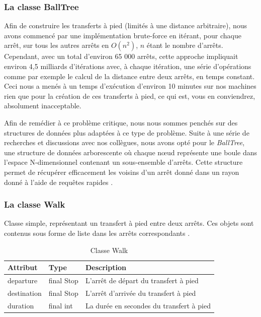 \documentclass[12pt]{article}
\begin{document}
\subsubsection{La classe BallTree}
\label{sec:balltree}
Afin de construire les transferts à pied (limités à une distance arbitraire), nous avons commencé par une implémentation brute-force en itérant, pour chaque arrêt, sur tous les
autres arrêts en $O(n^2)$, $n$ étant le nombre d'arrêts. Cependant, avec un total d'environ 65 000 arrêts, cette approche impliquait environ 4,5 milliards d'itérations avec, à chaque 
itération, une série d'opérations comme par exemple le calcul de la distance entre deux arrêts, en temps constant. Ceci nous a menés à un temps d'exécution d'environ 10 minutes sur nos 
machines rien que pour la création de ces transferts à pied, ce qui est, vous en conviendrez, absolument inacceptable.

Afin de remédier à ce problème critique, nous nous sommes penchés sur des structures de données plus adaptées à ce type de problème. Suite à une série de recherches et discussions avec
nos collègues, nous avons opté pour le \emph{BallTree}, une structure de données arborescente où chaque nœud représente une boule dans l'espace N-dimensionnel contenant un sous-ensemble d'arrêts.
Cette structure permet de récupérer efficacement les voisins d'un arrêt donné dans un rayon donné à l'aide de requêtes rapides \cite{BallTreedoc}.

\subsubsection{La classe Walk}
\label{sec:walk}
Classe simple, représentant un transfert à pied entre deux arrêts. Ces objets sont contenus sous forme de liste dans les arrêts correspondants \cite{dibbelt2017connection}.

\begin{table}[h]
    \centering
    \begin{tabular}{|l|l|p{8cm}|}
    \hline
    \textbf{Attribut} & \textbf{Type} & \textbf{Description} \\ \hline
    departure & final Stop & L'arrêt de départ du transfert à pied \\ \hline
    destination & final Stop & L'arrêt d'arrivée du transfert à pied \\ \hline
    duration & final int & La durée en secondes du transfert à pied \\ \hline
    \end{tabular}
    \caption{Classe Walk}
\end{table}
\end{document}
